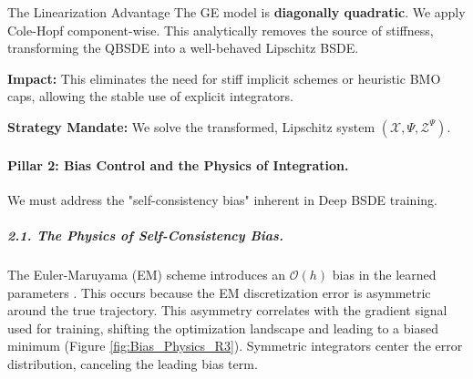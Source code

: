 \begin{distillresult}{The Linearization Advantage}
The GE model is \textbf{diagonally quadratic}. We apply Cole-Hopf component-wise. This analytically removes the source of stiffness, transforming the QBSDE into a well-behaved Lipschitz BSDE.
\end{distillresult}

\textbf{Impact:} This eliminates the need for stiff implicit schemes or heuristic BMO caps, allowing the stable use of explicit integrators.

\textbf{Strategy Mandate:} We solve the transformed, Lipschitz system $(\mathcal{X}, \Psi, \mathcal{Z}^\Psi)$.

\paragraph{Pillar 2: Bias Control and the Physics of Integration.}

We must address the "self-consistency bias" inherent in Deep BSDE training.

\subparagraph{2.1. The Physics of Self-Consistency Bias.}
The Euler-Maruyama (EM) scheme introduces an $\mathcal{O}(h)$ bias in the learned parameters \cite{ParkTu2025}. This occurs because the EM discretization error is asymmetric around the true trajectory. This asymmetry correlates with the gradient signal used for training, shifting the optimization landscape and leading to a biased minimum (Figure \ref{fig:Bias_Physics_R3}). Symmetric integrators center the error distribution, canceling the leading bias term.

